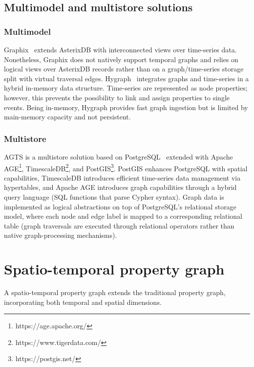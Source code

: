 \subsection{Multimodel and multistore solutions}
\subsubsection{Multimodel}
Graphix~\cite{DBLP:conf/icde/Galvizo024} extends AsterixDB with interconnected views over time-series data.
Nonetheless, Graphix does not natively support temporal graphs and relies on logical views over AsterixDB records rather than on a graph/time-series storage split with virtual traversal edges.
Hygraph~\cite{DBLP:conf/edbt/Ammar0BR25} integrates graphs and time-series in a hybrid in-memory data structure.
Time-series are represented as node properties; however, this prevents the possibility to link and assign properties to single events.%
Being in-memory, Hygraph provides fast graph ingestion but is limited by main-memory capacity and not persistent.%


\subsubsection{Multistore}
AGTS is a multistore solution based on PostgreSQL~\cite{DBLP:conf/sigmod/StonebrakerR86} extended with Apache AGE\footnote{https://age.apache.org/}, TimescaleDB\footnote{https://www.tigerdata.com/}, and PostGIS\footnote{https://postgis.net/}.
PostGIS enhances PostgreSQL with spatial capabilities, TimescaleDB introduces efficient time-series data management via hypertables, and Apache AGE introduces graph capabilities through a hybrid query language (SQL functions that parse Cypher syntax).
Graph data is implemented as logical abstractions on top of PostgreSQL's relational storage model, where each node and edge label is mapped to a corresponding relational table (graph traversals are executed through relational operators rather than native graph-processing mechanisms).

\section{Spatio-temporal property graph}\label{sec:formal}

A spatio-temporal property graph extends the traditional property graph, incorporating both temporal and spatial dimensions.

